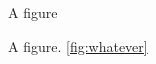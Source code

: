 \documentclass{article}
\begin{document}
\begin{figure}
\centering A figure
\caption{A figure. \autoref{fig:whatever}}
\label{fig:whatever}
\end{figure}
\end{document}
